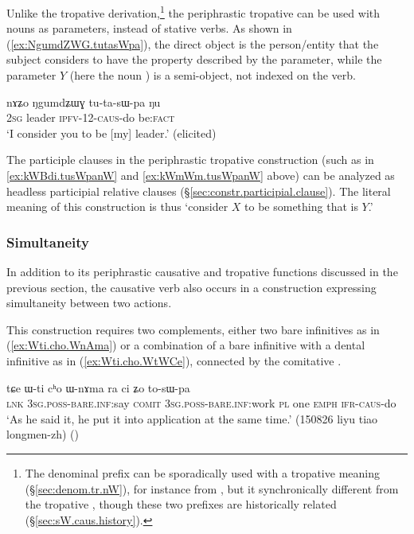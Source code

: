 Unlike the  tropative derivation,\footnote{The  denominal prefix can be sporadically used with a tropative meaning (§\ref{sec:denom.tr.nW}), for instance   from , but it synchronically different from the tropative , though these two prefixes are historically related (§\ref{sec:sW.caus.history}). } the  periphrastic tropative can be used with nouns as parameters, instead of stative verbs. As shown in (\ref{ex:NgumdZWG.tutasWpa}), the direct object is the person/entity that the subject considers to have the property described by the parameter, while the parameter $Y$ (here the noun ) is a semi-object, not indexed on the verb.

\begin{exe}
\ex \label{ex:NgumdZWG.tutasWpa}
\gll nɤʑo ŋgumdʑɯɣ tu-ta-sɯ-pa ŋu \\
\textsc{2sg} leader \textsc{ipfv}-1\fl{}2-\textsc{caus}-do be:\textsc{fact} \\
\glt `I consider you to be [my] leader.' (elicited)
\end{exe}

The participle clauses in the periphrastic tropative construction (such as in \ref{ex:kWBdi.tusWpanW} and \ref{ex:kWmWm.tusWpanW} above) can be analyzed as headless participial relative clauses (§\ref{sec:constr.participial.clause}). The literal meaning of this construction is thus `consider $X$ to be something that is $Y$.' 


\subsubsection{Simultaneity} \label{sec:bare.dental.inf.sWpa}
In addition to its periphrastic causative and tropative functions discussed in the previous section, the causative verb  also occurs in a construction expressing simultaneity between two actions. 

This construction requires two complements, either two bare infinitives as in (\ref{ex:Wti.cho.WnAma}) or a combination of a bare infinitive with a dental infinitive as in (\ref{ex:Wti.cho.WtWCe}), connected by the comitative .

\begin{exe} 
\ex \label{ex:Wti.cho.WnAma}
\gll tɕe ɯ-ti cʰo ɯ-nɤma ra ci ʑo to-sɯ-pa \\
\textsc{lnk} \textsc{3sg}.\textsc{poss}-\textsc{bare}.\textsc{inf}:say \textsc{comit} \textsc{3sg}.\textsc{poss}-\textsc{bare}.\textsc{inf}:work \textsc{pl} one \textsc{emph} \textsc{ifr}-\textsc{caus}-do \\
\glt `As he said it, he put it into application at the same time.' (150826 liyu tiao longmen-zh)
()
\end{exe} 


